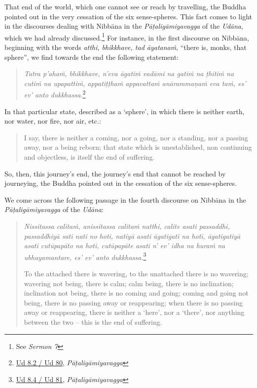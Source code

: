 That end of the world, which one cannot see or reach by travelling, the Buddha pointed out in the very cessation of the six sense-spheres. This fact comes to light in the discourses dealing with Nibbāna in the \emph{Pāṭaligāmiyavagga} of the \emph{Udāna}, which we had already discussed.\footnote{See \emph{Sermon 7}} For instance, in the first discourse on Nibbāna, beginning with the words \emph{atthi, bhikkhave, tad āyatanaṁ}, ``there is, monks, that sphere'', we find towards the end the following statement:

\begin{quote}
\emph{Tatra p'ahaṁ, bhikkhave, n'eva āgatiṁ vadāmi na gatiṁ na ṭhitiṁ na cutiṁ na upapattiṁ, appatiṭṭhaṁ appavattaṁ anārammaṇaṁ eva taṁ, es' ev' anto dukkhassa.}\footnote{\href{https://suttacentral.net/ud8.2/pli/ms}{Ud 8.2 / Ud 80}, \emph{Pāṭaligāmiyavagga}}
\end{quote}

In that particular state, described as a `sphere', in which there is neither earth, nor water, nor fire, nor air, etc.:

\begin{quote}
I say, there is neither a coming, nor a going, nor a standing, nor a passing away, nor a being reborn; that state which is unestablished, non continuing and objectless, is itself the end of suffering.
\end{quote}

So, then, this journey's end, the journey's end that cannot be reached by journeying, the Buddha pointed out in the cessation of the six sense-spheres.

We come across the following passage in the fourth discourse on Nibbāna in the \emph{Pāṭaligāmiyavagga} of the \emph{Udāna}:

\begin{quote}
\emph{Nissitassa calitaṁ, anissitassa calitaṁ natthi, calite asati passaddhi, passaddhiyā sati nati no hoti, natiyā asati āgatigati na hoti, āgatigatiyā asati cutūpapāto na hoti, cutūpapāte asati n' ev' idha na huraṁ na ubhayamantare, es' ev' anto dukkhassa.}\footnote{\href{https://suttacentral.net/ud8.4/pli/ms}{Ud 8.4 / Ud 81}, \emph{Pāṭaligāmiyavagga}}

To the attached there is wavering, to the unattached there is no wavering; wavering not being, there is calm; calm being, there is no inclination; inclination not being, there is no coming and going; coming and going not being, there is no passing away or reappearing; when there is no passing away or reappearing, there is neither a `here', nor a `there', nor anything between the two -- this is the end of suffering.
\end{quote}

